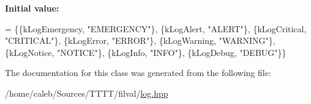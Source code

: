 {\bfseries Initial value\+:}
\begin{DoxyCode}
= \{\{kLogEmergency, \textcolor{stringliteral}{"EMERGENCY"}\},
                                                        \{kLogAlert,     \textcolor{stringliteral}{"ALERT"}\},
                                                        \{kLogCritical,  \textcolor{stringliteral}{"CRITICAL"}\},
                                                        \{kLogError,     \textcolor{stringliteral}{"ERROR"}\},
                                                        \{kLogWarning,   \textcolor{stringliteral}{"WARNING"}\},
                                                        \{kLogNotice,    \textcolor{stringliteral}{"NOTICE"}\},
                                                        \{kLogInfo,      \textcolor{stringliteral}{"INFO"}\},
                                                        \{kLogDebug,     \textcolor{stringliteral}{"DEBUG"}\}\}
\end{DoxyCode}


The documentation for this class was generated from the following file\+:\begin{DoxyCompactItemize}
\item 
/home/caleb/\+Sources/\+T\+T\+T\+T/filval/\hyperlink{log_8hpp}{log.\+hpp}\end{DoxyCompactItemize}
